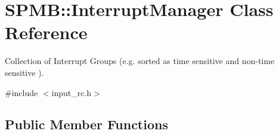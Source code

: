 \hypertarget{classSPMB_1_1InterruptManager}{}\section{S\+P\+MB\+:\+:Interrupt\+Manager Class Reference}
\label{classSPMB_1_1InterruptManager}


Collection of Interrupt Groups (e.\+g. sorted as time sensitive and non-\/time sensitive ).  




{\ttfamily \#include $<$input\+\_\+rc.\+h$>$}

\subsection*{Public Member Functions}
